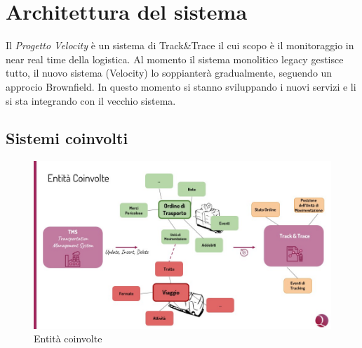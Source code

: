 \chapter{Architettura del sistema}
\label{ch:architecture}
Il \textit{Progetto Velocity} è un sistema di Track\&Trace il cui scopo è il monitoraggio in near real time della logistica.
Al momento il sistema monolitico legacy gestisce tutto, il nuovo sistema (Velocity) lo soppianterà gradualmente, seguendo un approcio Brownfield.
In questo momento si stanno sviluppando i nuovi servizi e li si sta integrando con il vecchio sistema.

\section{Sistemi coinvolti}
\label{sec:architecture_entity}

\begin{figure}[H]
\centering
    \includegraphics[scale=0.5]{images/architecture/entita_coinvolte.jpg}
    \caption{Entità coinvolte}
    \label{fig:architecture_entities_img}
\end{figure}

